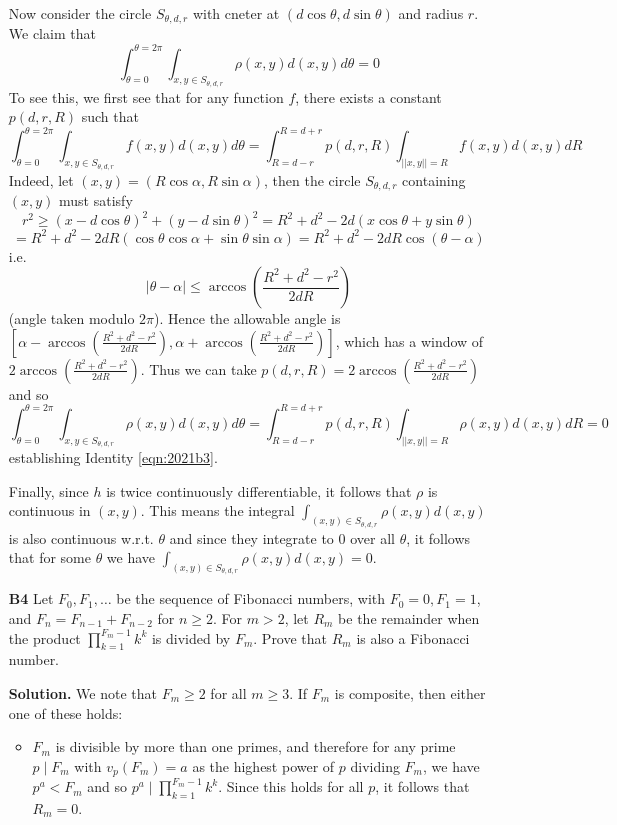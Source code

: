 \documentclass[11pt,a4paper]{article}
\newcommand{\norm}[1]{||#1||}
\newcommand{\<}{\langle}
\renewcommand{\>}{\rangle}
\begin{document}
\begin{enumerate}
	Now consider the circle $S_{\theta, d, r}$ with cneter at $(d\cos\theta, d\sin\theta)$ and radius $r$. 
	We claim that 
	\begin{equation}\label{eqn:2021b3}
	  \int_{\theta=0}^{\theta=2\pi}\int_{x,y\in S_{\theta, d, r}}\rho(x, y)d(x, y)d\theta=0
	\end{equation}
	To see this, we first see that for any function $f$, there exists a constant $p(d, r, R)$ such that 
	\[
	\int_{\theta=0}^{\theta=2\pi}\int_{x,y\in S_{\theta, d, r}}f(x, y)d(x, y)d\theta
	=\int_{R=d-r}^{R=d+r}p(d, r, R)\int_{\norm{x, y}=R} f(x, y)d(x, y)dR
	\]
	Indeed, let $(x, y)=(R\cos\alpha, R\sin\alpha)$, then the circle $S_{\theta, d, r}$ containing $(x, y)$ must satisfy 
	\[
	r^2\ge (x-d\cos\theta)^2+(y-d\sin\theta)^2
	=R^2+d^2-2d(x\cos\theta+y\sin\theta)
	\]\[
	=R^2+d^2-2dR(\cos\theta\cos\alpha+\sin\theta\sin\alpha)
	=R^2+d^2-2dR\cos(\theta-\alpha)
	\]
	i.e. 
	\[
	|\theta-\alpha|\le \arccos\left(\frac{R^2+d^2-r^2}{2dR}\right)
	\]
	(angle taken modulo $2\pi$). 
	Hence the allowable angle is $[\alpha - \arccos\left(\frac{R^2+d^2-r^2}{2dR}\right), \alpha+\arccos\left(\frac{R^2+d^2-r^2}{2dR}\right)]$, 
	which has a window of $2\arccos\left(\frac{R^2+d^2-r^2}{2dR}\right)$. 
	Thus we can take $p(d, r, R)= 2\arccos\left(\frac{R^2+d^2-r^2}{2dR}\right)$ and so 
	\[
	\int_{\theta=0}^{\theta=2\pi}\int_{x,y\in S_{\theta, d, r}}\rho(x, y)d(x, y)d\theta
	=\int_{R=d-r}^{R=d+r}p(d, r, R)\int_{\norm{x, y}=R} \rho(x, y)d(x, y)dR
	=0
	\]
	establishing Identity \ref{eqn:2021b3}. 
	
	Finally, since $h$ is twice continuously differentiable, it follows that $\rho$ is continuous in $(x, y)$. 
	This means the integral $\int_{(x, y)\in S_{\theta, d, r}}\rho(x, y)d(x, y)$ is also continuous w.r.t. $\theta$
	and since they integrate to 0 over all $\theta$, 
	it follows that for some $\theta$ we have $\int_{(x, y)\in S_{\theta, d, r}}\rho(x, y)d(x, y)=0$. 
	
	\item [\textbf{B4}] 
	Let $F_0,F_1,\dots$ be the sequence of Fibonacci numbers, with $F_0=0,F_1=1$, and $F_n=F_{n-1}+F_{n-2}$ for $n \ge 2$. For $m>2$, let $R_m$ be the remainder when the product $\prod_{k=1}^{F_m-1} k^k$ is divided by $F_m$. Prove that $R_m$ is also a Fibonacci number.
	
	\textbf{Solution.} 
	We note that $F_m\ge 2$ for all $m\ge 3$. 
	If $F_m$ is composite, then either one of these holds: 
	\begin{itemize}
		\item $F_m$ is divisible by more than one primes, and therefore for any prime $p\mid F_m$ with $v_{p}(F_m)=a$ as the highest power of $p$ dividing $F_m$, we have 
		$p^a<F_m$ and so $p^a\mid \prod_{k=1}^{F_m-1} k^k$. 
		Since this holds for all $p$, it follows that $R_m=0$. 
		

\end{itemize}
\end{enumerate}
\end{document}
